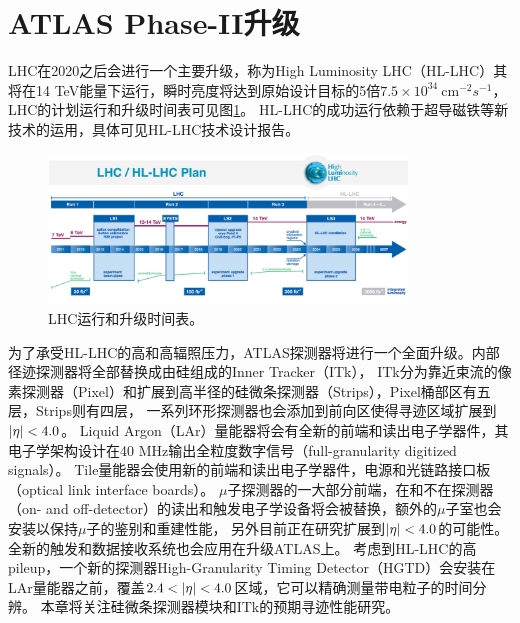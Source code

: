 \section{ATLAS Phase-II升级}
LHC在2020之后会进行一个主要升级，称为High Luminosity LHC（HL-LHC）其将在14 TeV能量下运行，瞬时亮度将达到原始设计目标的5倍$7.5\times10^{34}~\text{cm}^{-2}s^{-1}$，
LHC的计划运行和升级时间表可见图\ref{fig:LHC_timeline}。
HL-LHC的成功运行依赖于超导磁铁等新技术的运用，具体可见HL-LHC技术设计报告\cite{Apollinari:2284929}。
\begin{figure}[h]
\centering
 \includegraphics[width=0.85\textwidth]{fig/HL-LHC-PLAN.png}
 \caption{LHC运行和升级时间表\cite{Apollinari:2284929}。}
 \label{fig:LHC_timeline}
\end{figure}
为了承受HL-LHC的高\pileup 和高辐照压力，ATLAS探测器将进行一个全面升级。内部径迹探测器将全部替换成由硅组成的Inner Tracker（ITk），
ITk分为靠近束流的像素探测器（Pixel）\cite{Collaboration:2285585}和扩展到高半径的硅微条探测器（Strips）\cite{Collaboration:2017mtb}，Pixel桶部区有五层，Strips则有四层，
一系列环形探测器也会添加到前向区使得寻迹区域扩展到$|\eta|<4.0$。
Liquid Argon（LAr）量能器\cite{Collaboration:2285582}将会有全新的前端和读出电子学器件，其电子学架构设计在40 MHz输出全粒度数字信号（full-granularity digitized signals）。
Tile量能器\cite{Collaboration:2285583}会使用新的前端和读出电子学器件，电源和光链路接口板（optical link interface boards）。
$\mu$子探测器\cite{Collaboration:2285580}的一大部分前端，在和不在探测器（on- and off-detector）的读出和触发电子学设备将会被替换，额外的$\mu$子室也会安装以保持$\mu$子的鉴别和重建性能，
另外目前正在研究扩展到$|\eta|<4.0$的可能性。
全新的触发和数据接收系统\cite{Collaboration:2285584}也会应用在升级ATLAS上。
考虑到HL-LHC的高pileup，一个新的探测器High-Granularity Timing Detector（HGTD）\cite{Collaboration:2623663}会安装在LAr量能器之前，覆盖$2.4<\abseta<4.0$区域，它可以精确测量带电粒子的时间分辨。
本章将关注硅微条探测器模块和ITk的预期寻迹性能研究。

